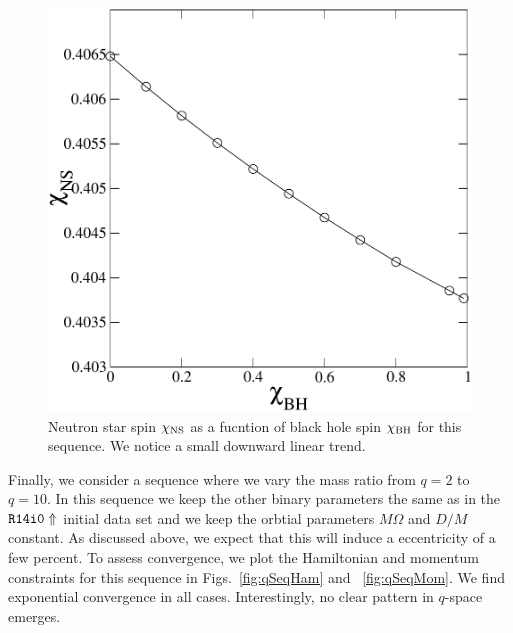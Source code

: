 \begin{figure}
\includegraphics[width=0.95\columnwidth]{chap4/chichi}
\caption[]{\label{fig:chichi}Neutron star spin $\chi_{\rm NS}$ as a fucntion of black hole spin $\chi_{\rm BH}$ for this sequence. We notice a small downward linear trend.}
\end{figure}




Finally, we consider a sequence where we vary the mass ratio from
$q=2$ to $q=10$. In this sequence we keep the other binary parameters
the same as in the ${\tt R14i0\Uparrow}$ initial data set and we keep the
orbtial parameters $M\Omega$ and $D/M$ constant. As discussed above,
we expect that this will induce a eccentricity of a few percent. To
assess convergence, we plot the Hamiltonian and momentum constraints
for this sequence in Figs.~\ref{fig:qSeqHam} and
~\ref{fig:qSeqMom}. We find exponential convergence in all
cases. Interestingly, no clear pattern in $q$-space emerges.

